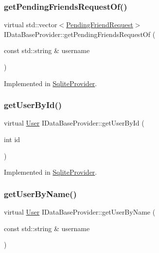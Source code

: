 \subsubsection{\texorpdfstring{get\+Pending\+Friends\+Request\+Of()}{getPendingFriendsRequestOf()}\hspace{0.1cm}{\footnotesize\ttfamily [2/2]}}
{\footnotesize\ttfamily virtual std\+::vector$<$\mbox{\hyperlink{structPendingFriendRequest}{Pending\+Friend\+Request}}$>$ I\+Data\+Base\+Provider\+::get\+Pending\+Friends\+Request\+Of (\begin{DoxyParamCaption}\item[{const std\+::string \&}]{username }\end{DoxyParamCaption})\hspace{0.3cm}{\ttfamily [pure virtual]}}



Implemented in \mbox{\hyperlink{classSqliteProvider_a82dcdc27e96ff8bfe63989af3e6eff62}{Sqlite\+Provider}}.

\mbox{\label{classIDataBaseProvider_a91cd76a2802e4dc03184f305a6624124}} 
\subsubsection{\texorpdfstring{get\+User\+By\+Id()}{getUserById()}}
{\footnotesize\ttfamily virtual \mbox{\hyperlink{structUser}{User}} I\+Data\+Base\+Provider\+::get\+User\+By\+Id (\begin{DoxyParamCaption}\item[{int}]{id }\end{DoxyParamCaption})\hspace{0.3cm}{\ttfamily [pure virtual]}}



Implemented in \mbox{\hyperlink{classSqliteProvider_a1e6db27d238aadcb5871c278521aea72}{Sqlite\+Provider}}.

\mbox{\label{classIDataBaseProvider_a716a0f86654a2fbee3f4e25e2083f7cb}} 
\subsubsection{\texorpdfstring{get\+User\+By\+Name()}{getUserByName()}}
{\footnotesize\ttfamily virtual \mbox{\hyperlink{structUser}{User}} I\+Data\+Base\+Provider\+::get\+User\+By\+Name (\begin{DoxyParamCaption}\item[{const std\+::string \&}]{username }\end{DoxyParamCaption})\hspace{0.3cm}{\ttfamily [pure virtual]}}



